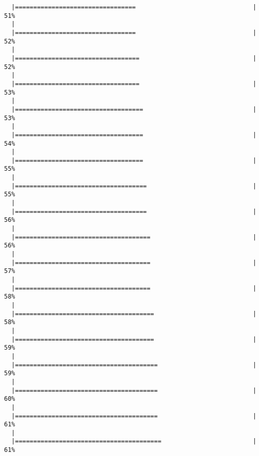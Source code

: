 \begin{knitrout}
\begin{kframe}
\begin{verbatim}
  |=================================                                |  51%
  |                                                                       
  |=================================                                |  52%
  |                                                                       
  |==================================                               |  52%
  |                                                                       
  |==================================                               |  53%
  |                                                                       
  |===================================                              |  53%
  |                                                                       
  |===================================                              |  54%
  |                                                                       
  |===================================                              |  55%
  |                                                                       
  |====================================                             |  55%
  |                                                                       
  |====================================                             |  56%
  |                                                                       
  |=====================================                            |  56%
  |                                                                       
  |=====================================                            |  57%
  |                                                                       
  |=====================================                            |  58%
  |                                                                       
  |======================================                           |  58%
  |                                                                       
  |======================================                           |  59%
  |                                                                       
  |=======================================                          |  59%
  |                                                                       
  |=======================================                          |  60%
  |                                                                       
  |=======================================                          |  61%
  |                                                                       
  |========================================                         |  61%

\end{verbatim}
\end{kframe}
\end{knitrout}
